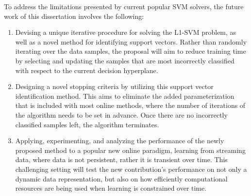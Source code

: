 \documentclass[reqno]{vcuthesis}
\newcommand{\iitem}{\item[-]}
\numberwithin{equation}{chapter}
\begin{document}
To address the limitations presented by current popular SVM solvers, the future work of this dissertation involves the following:
\begin{enumerate}
\iitem Devising a unique iterative procedure for solving the L1-SVM problem, as well as a novel method for identifying support vectors. Rather than randomly iterating over the data samples, the proposal will aim to reduce training time by selecting and updating the samples that are most incorrectly classified with respect to the current decision hyperplane.

\iitem Designing a novel stopping criteria by utilizing this support vector identification method. This aims to eliminate the added parameterization that is included with most online methods, where the number of iterations of the algorithm needs to be set in advance. Once there are no incorrectly classified samples left, the algorithm terminates.

\iitem Applying, experimenting, and analyzing the performance of the newly proposed method to a popular new online paradigm, learning from streaming data, where data is not persistent, rather it is transient over time. This challenging setting will test the new contribution's performance on not only a dynamic data representation, but also on how efficiently computational resources are being used when learning is constrained over time.
\end{enumerate}

\printbibliography[title={References}, heading=bibintoc]
\end{document}
